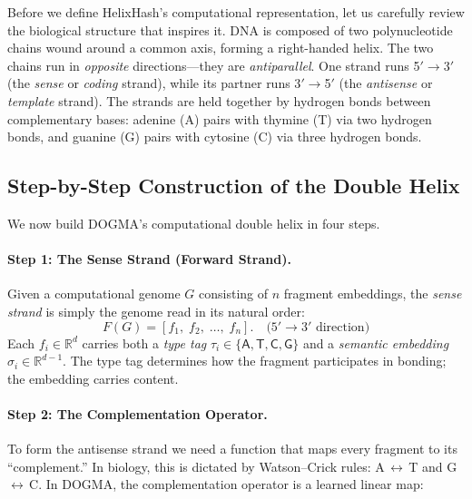 Before we define HelixHash's computational representation, let us carefully review the biological structure that inspires it. DNA is composed of two polynucleotide chains wound around a common axis, forming a right-handed helix. The two chains run in \emph{opposite} directions---they are \emph{antiparallel}. One strand runs 5\('\to\)3\('\) (the \emph{sense} or \emph{coding} strand), while its partner runs 3\('\to\)5\('\) (the \emph{antisense} or \emph{template} strand). The strands are held together by hydrogen bonds between complementary bases: adenine (A) pairs with thymine (T) via two hydrogen bonds, and guanine (G) pairs with cytosine (C) via three hydrogen bonds.

\subsection{Step-by-Step Construction of the Double Helix}

We now build DOGMA's computational double helix in four steps.

\paragraph{Step 1: The Sense Strand (Forward Strand).}
Given a computational genome $G$ consisting of $n$ fragment embeddings, the \emph{sense strand} is simply the genome read in its natural order:
\begin{equation}
F(G) = [f_1,\; f_2,\; \ldots,\; f_n]. \quad \text{(5\('\to\)3\('\) direction)}
\end{equation}
Each $f_i \in \mathbb{R}^d$ carries both a \emph{type tag} $\tau_i \in \{\mathsf{A}, \mathsf{T}, \mathsf{C}, \mathsf{G}\}$ and a \emph{semantic embedding} $\sigma_i \in \mathbb{R}^{d-1}$. The type tag determines how the fragment participates in bonding; the embedding carries content.

\paragraph{Step 2: The Complementation Operator.}
To form the antisense strand we need a function that maps every fragment to its ``complement.'' In biology, this is dictated by Watson--Crick rules: A\,$\leftrightarrow$\,T and G\,$\leftrightarrow$\,C. In DOGMA, the complementation operator is a learned linear map:

